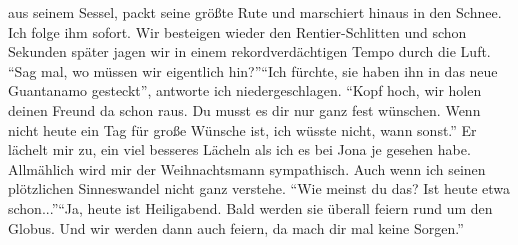 aus seinem Sessel, packt seine größte Rute und marschiert hinaus in den Schnee. Ich folge ihm sofort. Wir besteigen wieder den Rentier-Schlitten und schon Sekunden später jagen wir in einem rekordverdächtigen Tempo durch die Luft. "`Sag mal, wo müssen wir eigentlich hin?"'"`Ich fürchte, sie haben ihn in das neue Guantanamo gesteckt"', antworte ich niedergeschlagen. "`Kopf hoch, wir holen deinen Freund da schon raus. Du musst es dir nur ganz fest wünschen. Wenn nicht heute ein Tag für große Wünsche ist, ich wüsste nicht, wann sonst."' Er lächelt mir zu, ein viel besseres Lächeln als ich es bei Jona je gesehen habe. Allmählich wird mir der Weihnachtsmann sympathisch. Auch wenn ich seinen plötzlichen Sinneswandel nicht ganz verstehe. "`Wie meinst du das? Ist heute etwa schon..."'"`Ja, heute ist Heiligabend. Bald werden sie überall feiern rund um den Globus. Und wir werden dann auch feiern, da mach dir mal keine Sorgen."'